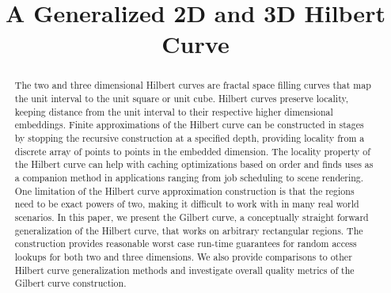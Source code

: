 \documentclass[
twocolumn,
]{ceurart}
\begin{document}



\title{ A Generalized 2D and 3D Hilbert Curve }



\begin{abstract}
The two and three dimensional Hilbert curves are fractal space filling curves that
map the unit interval to the unit square or unit cube.
Hilbert curves preserve locality, keeping distance from the unit interval
to their respective higher dimensional embeddings.
Finite approximations of the Hilbert curve can be constructed in stages
by stopping the recursive construction at a specified depth, providing locality
from a discrete array of points to points in the embedded dimension.
The locality property of the Hilbert curve can help with caching optimizations based on order
and finds uses as a companion method in applications ranging from job scheduling
to scene rendering.
One limitation of the Hilbert curve approximation construction is that the regions need
to be exact powers of two, making it difficult to work with in many real world
scenarios.
In this paper, we present the Gilbert curve,
a conceptually straight forward generalization of the Hilbert curve,
that works on arbitrary rectangular regions.
The construction provides reasonable worst case run-time guarantees for random
access lookups for both two and three dimensions.
We also provide comparisons to other Hilbert curve generalization methods
and investigate overall quality metrics of the Gilbert curve construction.
\end{abstract}

\maketitle

\newcommand{\specialcell}[2][c]{\begin{tabular}[#1]{@{}l@{}}#2\end{tabular}}
\newcommand{\specialcellCenter}[2][c]{\begin{tabular}[#1]{@{}c@{}}#2\end{tabular}}








%


\appendix


\end{document}
